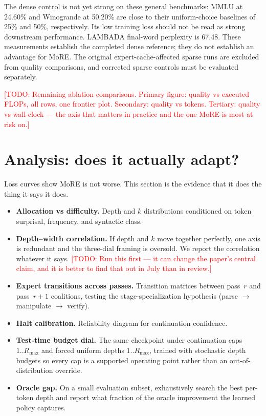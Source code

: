 \documentclass[11pt]{article}
\newcommand{\TODO}[1]{\textcolor{red}{[TODO: #1]}}
\newcommand{\Rmax}{R_{\max}}
\begin{document}


The dense control is not yet strong on these general benchmarks:
MMLU at 24.60\% and Winogrande at 50.20\% are close to their uniform-choice
baselines of 25\% and 50\%, respectively. Its low training loss should not be
read as strong downstream performance. LAMBADA final-word perplexity is
67.48. These measurements establish the completed dense reference; they do
not establish an advantage for MoRE. The original expert-cache-affected
sparse runs are excluded from quality comparisons, and corrected sparse
controls must be evaluated separately.

\TODO{Remaining ablation comparisons. Primary figure: quality vs executed FLOPs, all rows, one
frontier plot. Secondary: quality vs tokens. Tertiary: quality vs wall-clock ---
the axis that matters in practice and the one MoRE is most at risk on.}

\section{Analysis: does it actually adapt?}
\label{sec:analysis}

Loss curves show MoRE is not worse. This section is the evidence that it does the
thing it says it does.

\begin{itemize}
\item \textbf{Allocation vs difficulty.} Depth and $k$ distributions conditioned
on token surprisal, frequency, and syntactic class.
\item \textbf{Depth--width correlation.} If depth and $k$ move together
perfectly, one axis is redundant and the three-dial framing is oversold. We
report the correlation whatever it says. \TODO{Run this first --- it can change
the paper's central claim, and it is better to find that out in July than in
review.}
\item \textbf{Expert transitions across passes.} Transition matrices between
pass~$r$ and pass~$r{+}1$ coalitions, testing the stage-specialization
hypothesis (parse $\to$ manipulate $\to$ verify).
\item \textbf{Halt calibration.} Reliability diagram for continuation confidence.
\item \textbf{Test-time budget dial.} The same checkpoint under continuation caps
$1..\Rmax$ and forced uniform depths $1..\Rmax$, trained with stochastic depth
budgets so every cap is a supported operating point rather than an
out-of-distribution override.
\item \textbf{Oracle gap.} On a small evaluation subset, exhaustively search the
best per-token depth and report what fraction of the oracle improvement the
learned policy captures.
\end{itemize}
\end{document}
